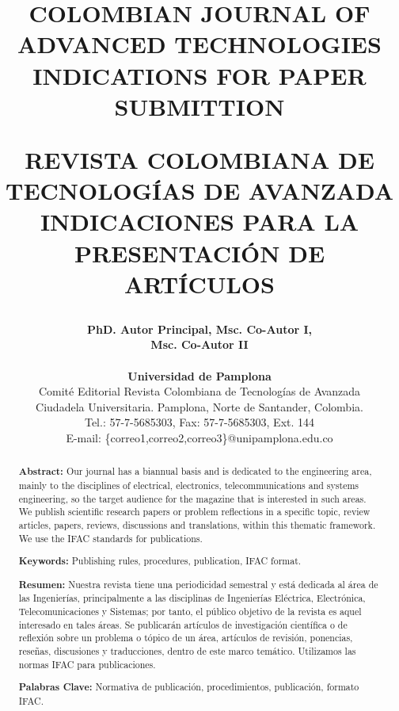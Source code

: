 \documentclass[10pt]{article}
\title{\vspace{0cm} \fontsize{10}{12}\selectfont \textbf{COLOMBIAN JOURNAL OF ADVANCED TECHNOLOGIES INDICATIONS FOR PAPER SUBMITTION} 

\vspace{6mm} \textbf{REVISTA COLOMBIANA DE TECNOLOGÍAS DE AVANZADA INDICACIONES PARA LA PRESENTACIÓN DE ARTÍCULOS}\vspace{4mm}}
\author{\fontsize{10}{12}\selectfont \textbf{\fontsize{10}{12}\selectfont PhD. Autor Principal, Msc. Co-Autor I,} \\ \textbf{\fontsize{10}{12}\selectfont Msc. Co-Autor II}\\ \\
\small{\textbf{\fontsize{10}{12}\selectfont Universidad de Pamplona}}\\
\small{\fontsize{10}{12}\selectfont Comité Editorial Revista Colombiana de Tecnologías de Avanzada}\\
\small{\fontsize{10}{12}\selectfont Ciudadela Universitaria. Pamplona, Norte de Santander, Colombia.} \\ \small{\fontsize{10}{12}\selectfont Tel.: 57-7-5685303, Fax: 57-7-5685303, Ext. 144}\\
\small{\fontsize{10}{12}\selectfont E-mail: \{correo1,correo2,correo3\}@unipamplona.edu.co}
}
\date{\vspace{-6mm}}
\begin{document}
\fontsize{10}{12}\selectfont


\def\tablename{Tabla}%

\setlength{\parskip}{0mm}

\maketitle

\setlength{\parskip}{3mm}


\renewcommand\abstractname{}

\begin{abstract}
    \fontsize{10}{12}\selectfont
    \textbf{Abstract:} Our journal has a biannual basis and is dedicated to the engineering area, mainly to the disciplines of electrical, electronics, telecommunications and systems engineering, so the target audience for the magazine that is interested in such areas. We publish scientific research papers or problem reflections in a specific topic, review articles, papers, reviews, discussions and translations, within this thematic framework. We use the IFAC standards for publications.

    \vspace{3mm}
    
    \textbf{Keywords:} Publishing rules, procedures, publication, IFAC format.
    \vspace{-7mm}
\end{abstract}


\renewcommand\abstractname{}

\begin{abstract}
    \fontsize{10}{12}\selectfont
    \textbf{Resumen:} Nuestra revista tiene una periodicidad semestral y está dedicada al área de las Ingenierías, principalmente a las disciplinas de Ingenierías Eléctrica, Electrónica, Telecomunicaciones y Sistemas; por tanto, el público objetivo de la revista es aquel interesado en tales áreas. Se publicarán artículos de investigación científica o de reflexión sobre un problema o tópico de un área, artículos de revisión, ponencias, reseñas, discusiones y traducciones, dentro de este marco temático. Utilizamos las normas IFAC para publicaciones.

    \vspace{3mm}
    
    \textbf{Palabras Clave:} Normativa de publicación, procedimientos, publicación, formato IFAC.
\end{abstract}
\end{document}
